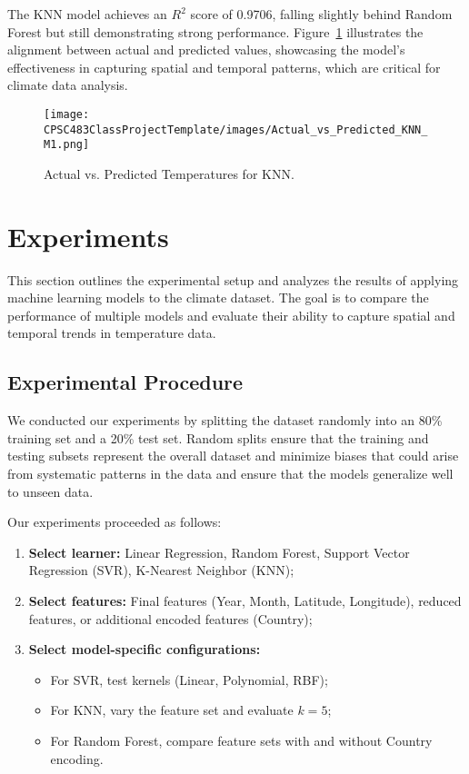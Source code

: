 \documentclass[conference]{IEEEtran}
\begin{document}
The KNN model achieves an \(R^2\) score of 0.9706, falling slightly behind Random Forest but still demonstrating strong performance. Figure~\ref{fig:KNN_plot} illustrates the alignment between actual and predicted values, showcasing the model's effectiveness in capturing spatial and temporal patterns, which are critical for climate data analysis.

\begin{figure}[htbp]
\centering
\texttt{[image: CPSC483ClassProjectTemplate/images/Actual\_vs\_Predicted\_KNN\_M1.png]}
\caption{Actual vs. Predicted Temperatures for KNN.}
\label{fig:KNN_plot}
\end{figure}

\section{Experiments}
This section outlines the experimental setup and analyzes the results of applying machine learning models to the climate dataset. The goal is to compare the performance of multiple models and evaluate their ability to capture spatial and temporal trends in temperature data.
\subsection{Experimental Procedure}
We conducted our experiments by splitting the dataset randomly into an 80\% training set and a 20\% test set. Random splits ensure that the training and testing subsets represent the overall dataset and minimize biases that could arise from systematic patterns in the data and ensure that the models generalize well to unseen data.

Our experiments proceeded as follows:
\begin{enumerate}
    \item \textbf{Select learner:} Linear Regression, Random Forest, Support Vector Regression (SVR), K-Nearest Neighbor (KNN);
    \item \textbf{Select features:} Final features (Year, Month, Latitude, Longitude), reduced features, or additional encoded features (Country);
    \item \textbf{Select model-specific configurations:}
    \begin{itemize}
        \item For SVR, test kernels (Linear, Polynomial, RBF);
        \item For KNN, vary the feature set and evaluate \(k = 5\);
        \item For Random Forest, compare feature sets with and without Country encoding.
    \end{itemize}
\end{enumerate}
\end{document}
